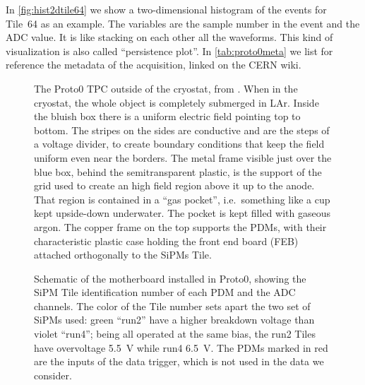 In \autoref{fig:hist2dtile64} we show a two-dimensional histogram of the events
for Tile~64 as an example. The variables are the sample number in the event and
the ADC value. It is like stacking on each other all the waveforms. This kind
of visualization is also called ``persistence plot''. In
\autoref{tab:proto0meta} we list for reference the metadata of the
acquisition, linked on the CERN wiki.

\begin{figure}
    
    
    \caption{\label{fig:proto0} The Proto0 TPC outside of the cryostat, from
    \cite[50]{luzzi2020}. When in the cryostat, the whole object is completely
    submerged in LAr. Inside the bluish box there is a uniform electric field
    pointing top to bottom. The stripes on the sides are conductive and are the
    steps of a voltage divider, to create boundary conditions that keep the
    field uniform even near the borders. The metal frame visible just over the
    blue box, behind the semitransparent plastic, is the support of the grid
    used to create an high field region above it up to the anode. That region
    is contained in a ``gas pocket'', i.e.\ something like a cup kept
    upside-down underwater. The pocket is kept filled with gaseous argon. The
    copper frame on the top supports the PDMs, with their characteristic
    plastic case holding the front end board (FEB) attached orthogonally to the
    SiPMs Tile.}
    
\end{figure}

\begin{figure}
    
    
    \caption{\label{fig:pdmadcch} Schematic of the motherboard installed in
    Proto0, showing the SiPM Tile identification number of each PDM and the ADC
    channels. The color of the Tile number sets apart the two set of SiPMs
    used: green ``run2'' have a higher breakdown voltage than violet ``run4'';
    being all operated at the same bias, the run2 Tiles have overvoltage
    \SI{5.5}{V} while run4 \SI{6.5}{V}. The PDMs marked in red are the inputs
    of the data trigger, which is not used in the data we consider.}

\end{figure}

